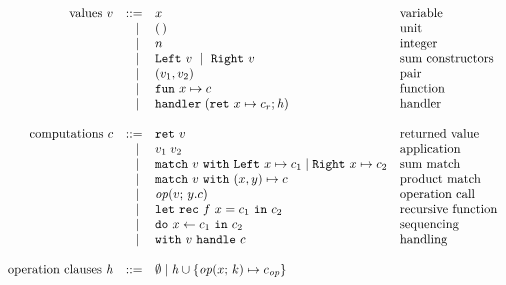 
\[
	\begin{array}{rrll}
		\text{values}~v
		 & ::=   & x                      			& \text{variable}          \\
		 & \vsep & \unit												& \text{unit}							 \\
		 & \vsep & n														& \text{integer}					 \\
		 & \vsep & \inleft{v}~\vsep~\inright{v} & \text{sum constructors}  \\
		 & \vsep & \pair{v_1}{v_2}							&	\text{pair}						 	 \\
		 & \vsep & \fun{x}{c}             			& \text{function}          \\
		 & \vsep & \handler{\hcases}      			& \text{handler}           \\
		 \\
		 \text{computations}~c
		 & ::=   & \return{v}             		& \text{returned value}    		\\
		 & \vsep & \apply{v_1}{v_2}       		& \text{application}       		\\
		 & \vsep & \match{v} \inleft{x} \mapsto c_1 
		 							\vsep \inright{x} \mapsto c_2 & \text{sum match} 			\\
		 & \vsep & \match{v} \pair{x}{y} \mapsto c 	& \text{product match} 	\\
		 & \vsep & \operation{v}{y.c}     		& \text{operation call}    		\\
		 & \vsep & \letrec{f}{x}{c_1} {c_2}		& \text{recursive function} 	\\
		 & \vsep & \dobind{x}{c_1}{c_2}   		& \text{sequencing}        		\\
		 & \vsep & \withhandle{v}{c}      		& \text{handling}					 		\\
		 \\
		 \text{operation clauses}~\hcases
			& ::=   & \emptyhcases 
			\vsep 		\hcases \union \set{\operation{x}{k} \mapsto c_{\op}} 	\\
		\end{array}
		\]
